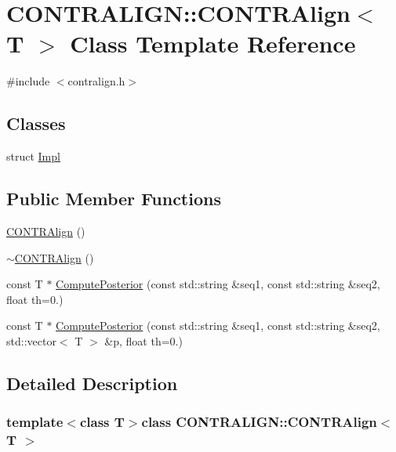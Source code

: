 \hypertarget{class_c_o_n_t_r_a_l_i_g_n_1_1_c_o_n_t_r_align}{\section{C\+O\+N\+T\+R\+A\+L\+I\+G\+N\+:\+:C\+O\+N\+T\+R\+Align$<$ T $>$ Class Template Reference}
\label{class_c_o_n_t_r_a_l_i_g_n_1_1_c_o_n_t_r_align}
}


{\ttfamily \#include $<$contralign.\+h$>$}

\subsection*{Classes}
\begin{DoxyCompactItemize}
\item 
struct \hyperlink{struct_c_o_n_t_r_a_l_i_g_n_1_1_c_o_n_t_r_align_1_1_impl}{Impl}
\end{DoxyCompactItemize}
\subsection*{Public Member Functions}
\begin{DoxyCompactItemize}
\item 
\hyperlink{class_c_o_n_t_r_a_l_i_g_n_1_1_c_o_n_t_r_align_a0323bb64e04f9c29265eb4301f3e0957}{C\+O\+N\+T\+R\+Align} ()
\item 
\hyperlink{class_c_o_n_t_r_a_l_i_g_n_1_1_c_o_n_t_r_align_a5e54e0ccf359bb11aa187b6c0e25f76c}{$\sim$\+C\+O\+N\+T\+R\+Align} ()
\item 
const T $\ast$ \hyperlink{class_c_o_n_t_r_a_l_i_g_n_1_1_c_o_n_t_r_align_a8ec224357474168884cf0bebd0ac2ea7}{Compute\+Posterior} (const std\+::string \&seq1, const std\+::string \&seq2, float th=0.)
\item 
const T $\ast$ \hyperlink{class_c_o_n_t_r_a_l_i_g_n_1_1_c_o_n_t_r_align_af353728417b9a1235310da06ac137742}{Compute\+Posterior} (const std\+::string \&seq1, const std\+::string \&seq2, std\+::vector$<$ T $>$ \&p, float th=0.)
\end{DoxyCompactItemize}


\subsection{Detailed Description}
\subsubsection*{template$<$class T$>$class C\+O\+N\+T\+R\+A\+L\+I\+G\+N\+::\+C\+O\+N\+T\+R\+Align$<$ T $>$}



